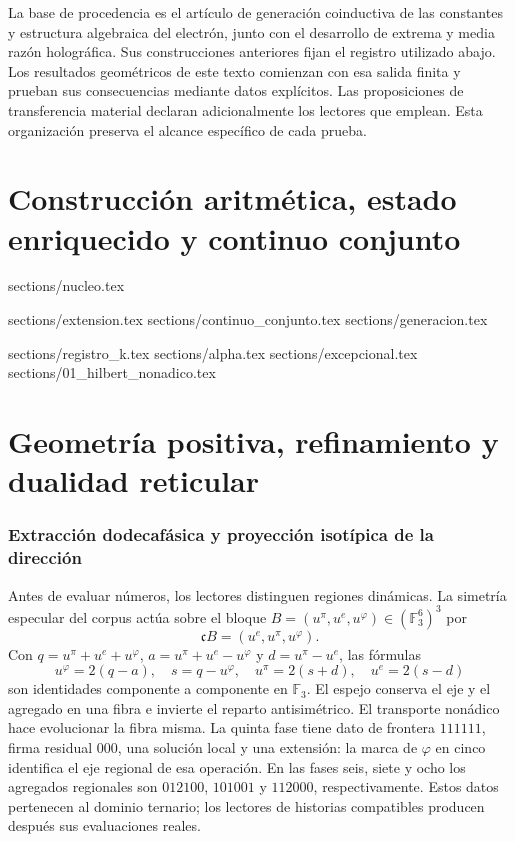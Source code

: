 \documentclass[a4paper,10pt]{article}
\theoremstyle{definition}\newtheorem{definition}[theorem]{Definición}
\theoremstyle{remark}\newtheorem{remark}[theorem]{Observación}
\newcommand{\TRIT}{\mathrm{TRIT}}\newcommand{\id}{\operatorname{id}}
\numberwithin{equation}{section}
\begin{document}
La base de procedencia es el artículo de generación coinductiva de las
constantes y estructura algebraica del electrón, junto con el desarrollo
de extrema y media razón holográfica. Sus construcciones anteriores fijan
el registro utilizado abajo. Los resultados geométricos de este texto comienzan
con esa salida finita y prueban sus consecuencias mediante datos explícitos. Las
proposiciones de transferencia material declaran adicionalmente los
lectores que emplean. Esta organización preserva el alcance específico de
cada prueba.

\clearpage
\part{Construcción aritmética, estado enriquecido y continuo conjunto}
\begingroup
\sloppy
\renewcommand{\TRIT}{\{-1,0,+1\}}
{sections/nucleo.tex}
\clearpage

{sections/extension.tex}
{sections/continuo_conjunto.tex}
{sections/generacion.tex}
\clearpage


\clearpage

\clearpage
{sections/registro_k.tex}
{sections/alpha.tex}
{sections/excepcional.tex}
{sections/01_hilbert_nonadico.tex}
\endgroup
\clearpage
\part{Geometría positiva, refinamiento y dualidad reticular}



\section{Extracción dodecafásica y proyección isotípica de la dirección}
\label{sec:register}
Antes de evaluar números, los lectores distinguen regiones dinámicas.
La simetría especular del corpus actúa sobre el bloque
\(B=(u^\pi,u^e,u^\varphi)\in(\mathbb F_3^6)^3\) por
\[
 \mathfrak cB=(u^e,u^\pi,u^\varphi).
\]
Con \(q=u^\pi+u^e+u^\varphi\),
\(a=u^\pi+u^e-u^\varphi\) y \(d=u^\pi-u^e\), las fórmulas
\[
 u^\varphi=2(q-a),\quad s=q-u^\varphi,\quad
 u^\pi=2(s+d),\quad u^e=2(s-d)
\]
son identidades componente a componente en \(\mathbb F_3\). El espejo
conserva el eje y el agregado en una fibra e invierte el reparto
antisimétrico. El transporte nonádico hace evolucionar la fibra misma.
La quinta fase tiene dato de frontera \(111111\), firma residual
\(000\), una solución local y una extensión: la marca de
\(\varphi\) en cinco identifica el eje regional de esa operación.
En las fases seis, siete y ocho los agregados regionales son
\(012100\), \(101001\) y \(112000\), respectivamente. Estos datos
pertenecen al dominio ternario; los lectores de historias compatibles
producen después sus evaluaciones reales.
\end{document}
